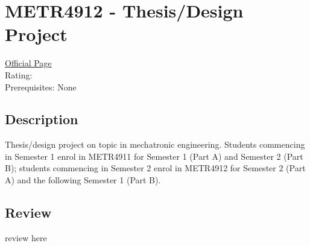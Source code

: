 \hypertarget{METR4912}{\section{METR4912 - Thesis/Design Project}}

\large
\textcolor{turbo_purple}{\href{https://my.uq.edu.au/programs-courses/course.html?course_code=METR4912}{Official Page}} \\
Rating: \cstar\cstar\cstar\cstar\ostar \\
Prerequisites: None

\normalsize
\subsection*{Description}
Thesis/design project on topic in mechatronic engineering.
Students commencing in Semester 1 enrol in METR4911 for Semester 1 (Part A) and Semester 2 (Part B); students commencing in Semester 2 enrol in METR4912 for Semester 2 (Part A) and the following Semester 1 (Part B).

\subsection*{Review}
review here
